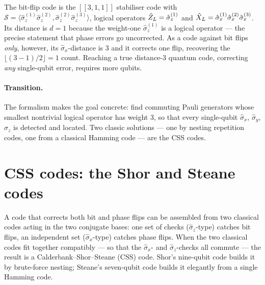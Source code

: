 \begin{example}
\label{ex:rep-stabiliser}
The bit-flip code is the $[[3,1,1]]$ stabiliser code with
$\mathcal S=\langle\hat\sigma_z^{(1)}\hat\sigma_z^{(2)},
\hat\sigma_z^{(2)}\hat\sigma_z^{(3)}\rangle$, logical operators
$\hat{Z}_L=\hat\sigma_z^{(1)}$ and
$\hat{X}_L=\hat\sigma_x^{(1)}\hat\sigma_x^{(2)}\hat\sigma_x^{(3)}$. Its
distance is $d=1$ because the weight-one $\hat\sigma_z^{(1)}$ is a
logical operator --- the precise statement that phase errors go
uncorrected. As a code against bit flips \emph{only}, however, its
$\hat\sigma_x$-distance is $3$ and it corrects one flip, recovering the
$\lfloor(3-1)/2\rfloor=1$ count. Reaching a true distance-$3$ quantum
code, correcting \emph{any} single-qubit error, requires more qubits.
\end{example}

\paragraph{Transition.}
The formalism makes the goal concrete: find commuting Pauli generators
whose smallest nontrivial logical operator has weight $3$, so that every
single-qubit $\hat\sigma_x$, $\hat\sigma_y$, $\hat\sigma_z$ is detected
and located. Two classic solutions --- one by nesting repetition codes,
one from a classical Hamming code --- are the CSS codes.

\section{CSS codes: the Shor and Steane codes}
\label{sec:css}

\begin{phenomenon}
A code that corrects both bit and phase flips can be assembled from
two classical codes acting in the two conjugate bases: one set of checks
($\hat\sigma_z$-type) catches bit flips, an independent set
($\hat\sigma_x$-type) catches phase flips. When the two classical codes
fit together compatibly --- so that the $\hat\sigma_x$- and
$\hat\sigma_z$-checks all commute --- the result is a
Calderbank--Shor--Steane (CSS) code. Shor's nine-qubit code builds it by
brute-force nesting; Steane's seven-qubit code builds it elegantly from
a single Hamming code.
\end{phenomenon}

